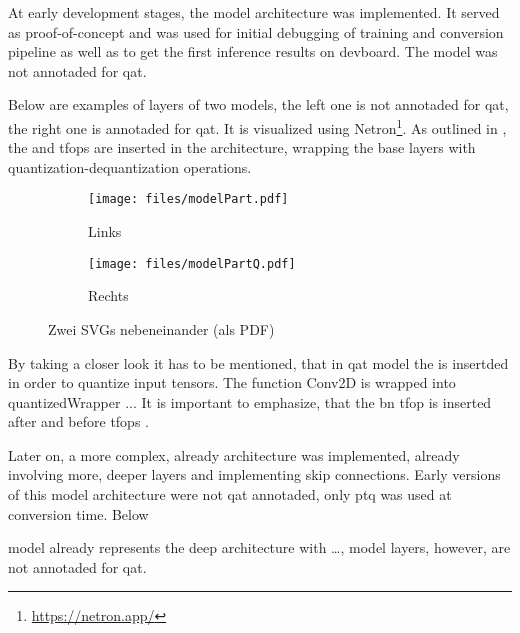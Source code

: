 {At early development stages, the model architecture  was implemented.
It served as proof-of-concept and was used for initial debugging of training and conversion pipeline as well as to get the first inference results on \gls{devboard}.
The model was not annotaded for \gls{qat}.

Below are examples of layers of two models, the left one is not annotaded for \gls{qat}, the right one is annotaded for \gls{qat}.
It is visualized using Netron\footnote{\url{https://netron.app/}}.
As outlined in , the  and  \glspl{tfop} are inserted in the architecture,
wrapping the base layers with quantization-dequantization operations.


\begin{figure}[H]
  \centering
  \begin{subfigure}[t]{0.48\textwidth}
    \centering
    \texttt{[image: files/modelPart.pdf]}
    \caption{Links}
  \end{subfigure}
  \hfill
  \begin{subfigure}[t]{0.48\textwidth}
    \centering
    \texttt{[image: files/modelPartQ.pdf]}
    \caption{Rechts}
  \end{subfigure}
  \caption{Zwei SVGs nebeneinander (als PDF)}
\end{figure}

By taking a closer look it has to be mentioned, that in \gls{qat} model the  is insertded in order to quantize input tensors.
The function Conv2D is wrapped into quantizedWrapper ...
It is important to emphasize, that the \gls{bn} \gls{tfop} is inserted after  and before  \glspl{tfop} \cite{batchnormActivation}.

Later on, a more complex, already  architecture was implemented, already involving more, deeper layers and implementing skip connections.
Early versions of this model architecture were not \gls{qat} annotaded, only \gls{ptq} was used at conversion time.
Below 

 model already represents the deep  architecture with \dots, model layers, however, are not annotaded for \gls{qat}.

}
